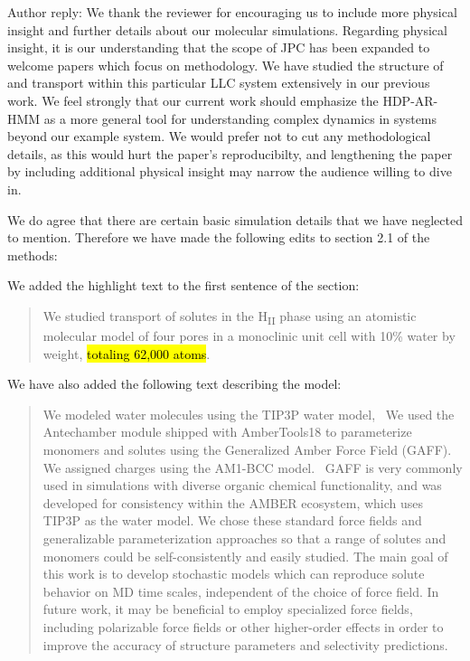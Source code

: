 \documentclass{article}
\begin{document}
\begin{enumerate}[label={Comment \theenumi :}, leftmargin=3.9\parindent]
    Author reply: We thank the reviewer for encouraging us to include more physical insight and
    further details about our molecular simulations. Regarding physical insight, it is our 
    understanding that the scope of JPC has been expanded to welcome papers which focus on 
    methodology. We have studied the structure of and transport within this particular LLC system
    extensively in our previous work.\cite{} We feel strongly that our current work should 
    emphasize the HDP-AR-HMM as a more general tool for understanding complex dynamics in 
    systems beyond our example system. We would prefer not to cut any methodological details, as
    this would hurt the paper's reproducibilty, and lengthening the paper by including additional
    physical insight may narrow the audience willing to dive in.
    
  
    We do agree that there are certain basic simulation details that we have neglected to 
    mention. Therefore we have made the following edits to section 2.1 of the methods:
    
    We added the highlight text to the first sentence of the section:
    \begin{quote}
      We studied transport of solutes in the H\textsubscript{II} phase using an atomistic 
      molecular model of four pores in a monoclinic unit cell with 10\% water by weight, 
      \hl{totaling 62,000 atoms}.    
    \end{quote}
    
    We have also added the following text describing the model: %
    \begin{quote}
    We modeled water molecules using the TIP3P water model,~\cite{jorgensen_comparison_1983}
    We used the Antechamber module shipped with AmberTools18 to parameterize monomers and 
    solutes using the Generalized Amber Force Field (GAFF).~\cite{wang_development_2004} We 
    assigned charges using the AM1-BCC model.~\cite{jakalian_fast_2000,jakalian_fast_2002}
    GAFF is very commonly used in simulations with diverse organic chemical functionality, 
    and was developed for consistency within the AMBER ecosystem, which uses TIP3P as the
    water model. We chose these standard force fields and generalizable parameterization 
    approaches so that a range of solutes and monomers could be self-consistently and easily 
    studied. The main goal of this work is to develop stochastic models which can reproduce
    solute behavior on MD time scales, independent of the choice of force field. In future 
    work, it may be beneficial to employ specialized force fields, including polarizable 
    force fields or other higher-order effects in order to improve the accuracy of structure 
    parameters and selectivity predictions.
    \end{quote}


\end{enumerate}
\end{document}
